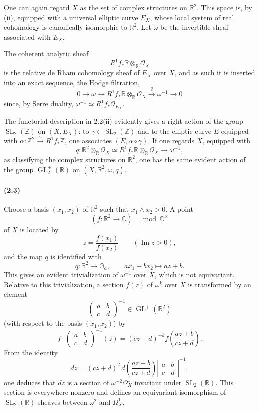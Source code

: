 \documentclass[10pt]{article}
\newcommand{\C}{\mathbb C}
\newcommand{\R}{\mathbb R}
\newcommand{\Z}{\mathbb Z}
\newcommand{\Ga}{\mathbb G_a}
\newcommand{\GL}{\operatorname{GL}}
\newcommand{\SL}{\operatorname{SL}}
\newcommand{\cO}{\mathcal O}
\begin{document}
One can again regard $X$ as the set of complex structures on $\R^2$. This space is,
by (ii), equipped with a universal elliptic curve $E_X$, whose local system of real
cohomology is canonically isomorphic to $\R^2$. Let $\omega$ be the invertible sheaf
associated with $E_X$.

The coherent analytic sheaf
\[
R^1f_*\R\otimes_\R\cO_X
\]
is the relative de Rham cohomology sheaf of $E_X$ over $X$, and as such it is inserted
into an exact sequence, the Hodge filtration,
\[
0\longrightarrow \omega\longrightarrow R^1f_*\R\otimes_\R\cO_X
\xrightarrow{q}\omega^{-1}\longrightarrow 0
\]
since, by Serre duality, $\omega^{-1}\simeq R^1f_*\cO_{E_X}$.

The functorial description in 2.2(ii) evidently gives a right action of the group $\SL_2(\Z)$
on $(X,E_X)$: to $\gamma\in\SL_2(\Z)$ and to the elliptic curve $E$ equipped with
$\alpha:\Z^2\xrightarrow{\sim}R^1f_*\Z$, one associates $(E,\alpha\circ\gamma)$. If one
regards $X$, equipped with
\[
q:\R^2\otimes_\R\cO_X\simeq R^1f_*\R\otimes_\R\cO_X\longrightarrow \omega^{-1},
\]
as classifying the complex structures on $\R^2$, one has the same evident action of the
group $\GL_2^+(\R)$ on $(X,\R^2,\omega,q)$.

\paragraph{(2.3)}
Choose a basis $(x_1,x_2)$ of $\R^2$ such that $x_1\wedge x_2>0$. A point
\[
(f:\R^2\to \C)\quad \bmod \C^\times
\]
of $X$ is located by
\[
z=\frac{f(x_1)}{f(x_2)}\qquad (\operatorname{Im}z>0),
\]
and the map $q$ is identified with
\[
q:\R^2\to\Ga,\qquad ax_1+bx_2\longmapsto az+b.
\]
This gives an evident trivialization of $\omega^{-1}$ over $X$, which is not equivariant.
Relative to this trivialization, a section $f(z)$ of $\omega^k$ over $X$ is transformed by
an element
\[
\begin{pmatrix}a&b\\ c&d\end{pmatrix}^{-1}\in \GL^+(\R^2)
\]
(with respect to the basis $(x_1,x_2)$) by
\[
f\cdot
\begin{pmatrix}a&b\\ c&d\end{pmatrix}^{-1}(z)
=(cz+d)^{-k}f\!\left(\frac{az+b}{cz+d}\right).
\]
From the identity
\[
dz=(cz+d)^2\,d\!\left(\frac{az+b}{cz+d}\right)
\left|\begin{matrix}a&b\\ c&d\end{matrix}\right|^{-1},
\]
one deduces that $dz$ is a section of $\omega^{-2}\Omega^1_X$ invariant under
$\SL_2(\R)$. This section is everywhere nonzero and defines an equivariant isomorphism
of $\SL_2(\R)$-sheaves between $\omega^2$ and $\Omega^1_X$.
\end{document}

